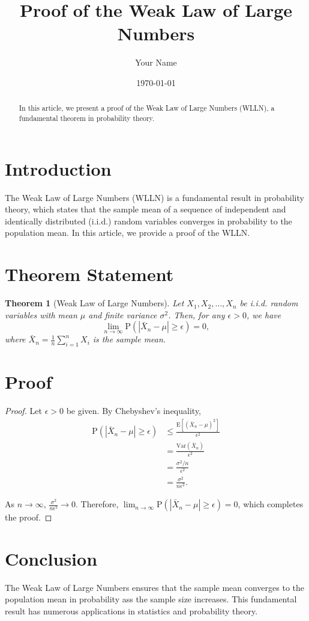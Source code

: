 \documentclass{article}
\title{Proof of the Weak Law of Large Numbers}
\author{Your Name}
\date{\today}
\newtheorem{theorem}{Theorem}
\begin{document}
\maketitle

\begin{abstract}
    In this article, we present a proof of the Weak Law of Large Numbers (WLLN), a fundamental theorem in probability theory.
\end{abstract}

\section{Introduction}

The Weak Law of Large Numbers (WLLN) is a fundamental result in probability theory, which states that the sample mean of a sequence of independent and identically distributed (i.i.d.) random variables converges in probability to the population mean. In this article, we provide a proof of the WLLN.

\section{Theorem Statement}

\begin{theorem}[Weak Law of Large Numbers]
    Let $X_1, X_2, \ldots, X_n$ be i.i.d. random variables with mean $\mu$ and finite variance $\sigma^2$. Then, for any $\epsilon > 0$, we have
    \[
        \lim_{n \to \infty} \mathrm{P}\left(|\bar{X}_n - \mu| \geq \epsilon\right) = 0,
    \]
    where $\bar{X}_n = \frac{1}{n} \sum_{i=1}^{n} X_i$ is the sample mean.
\end{theorem}

\section{Proof}

\begin{proof}
    Let $\epsilon > 0$ be given. By Chebyshev's inequality,
    \begin{align*}
        \mathrm{P}\left(|\bar{X}_n - \mu| \geq \epsilon\right) &\leq \frac{\mathrm{E}[(\bar{X}_n - \mu)^2]}{\epsilon^2} \\
        &= \frac{\mathrm{Var}(\bar{X}_n)}{\epsilon^2} \\
        &= \frac{\sigma^2/n}{\epsilon^2} \\
        &= \frac{\sigma^2}{n\epsilon^2}.
    \end{align*}
    
    As $n \to \infty$, $\frac{\sigma^2}{n\epsilon^2} \to 0$. Therefore,  $\lim_{n \to \infty} \mathrm{P}\left(|\bar{X}_n - \mu| \geq \epsilon\right) = 0$, which completes the proof.
\end{proof}

\section{Conclusion}

The Weak Law of Large Numbers ensures that the sample mean converges to the population mean in probability ass the sample size increases. This fundamental result has numerous applications in statistics and probability theory.
\end{document}
